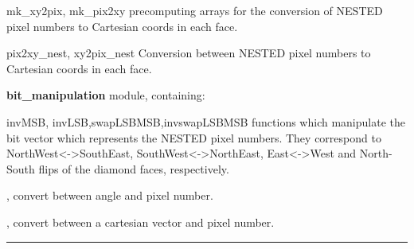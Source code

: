 \begin{modules}
  \begin{sulist}{} %
 \item[mk\_xy2pix, mk\_pix2xy] precomputing arrays for the conversion
 of NESTED pixel numbers to Cartesian coords in each face.
 \item[pix2xy\_nest, xy2pix\_nest] Conversion between NESTED pixel numbers to Cartesian coords in each face.
 \item[\textbf{bit\_manipulation}] module, containing:
 \item[invMSB, invLSB,swapLSBMSB,invswapLSBMSB] functions which manipulate the bit vector which
 represents the NESTED pixel numbers. They correspond to
 NorthWest<->SouthEast, SouthWest<->NorthEast, East<->West and
 North-South flips of the diamond faces, respectively.
  \end{sulist}
\end{modules}

\begin{related}
  \begin{sulist}{} %
  \item[\htmlref{pix2ang}{sub:pix_tools}, \htmlref{ang2pix}{sub:pix_tools}] convert between angle and pixel number.
  \item[\htmlref{pix2vec}{sub:pix_tools}, \htmlref{vec2pix}{sub:pix_tools}] convert between a cartesian vector and pixel number.
  \end{sulist}
\end{related}

\rule{\hsize}{2mm}


